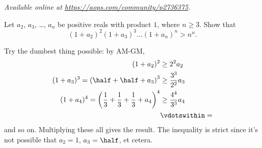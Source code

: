 \textsl{Available online at \url{https://aops.com/community/p2736375}.}
\begin{mdframed}[style=mdpurplebox,frametitle={Problem statement}]
Let $a_2$, $a_3$, \dots, $a_n$ be positive reals with product $1$,
where $n \ge 3$.
Show that
\[ (1+a_2)^2 (1+a_3)^3 \dots (1+a_n)^n > n^n. \]
\end{mdframed}
Try the dumbest thing possible: by AM-GM,
\begin{align*}
  (1 + a_2)^2 &\ge 2^2 a_2 \\
  (1 + a_3)^3 = \left( \half + \half + a_3 \right)^3 &\ge \frac{3^3}{2^2} a_3 \\
  (1 + a_4)^4 = \left( \frac13 + \frac13 + \frac13 + a_4 \right)^4
    &\ge \frac{4^4}{3^3} a_4 \\
  &\vdotswithin=
\end{align*}
and so on.
Multiplying these all gives the result.
The inequality is strict since it's not possible
that $a_2 = 1$, $a_3 = \half$, et cetera.
\pagebreak